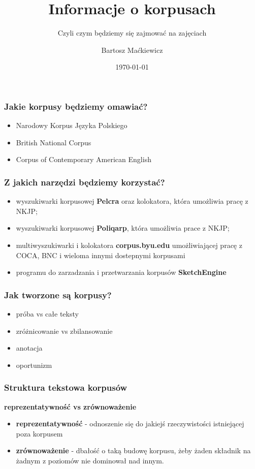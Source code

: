 \documentclass{beamer}
\title{Informacje o korpusach}
\subtitle{Czyli czym będziemy się zajmować na zajęciach}
\date{\today}
\author{Bartosz Maćkiewicz}
\institute{Instytut Filozofii, Uniwersytet Warszawski}
\begin{document}
\maketitle

\begin{frame}
  \frametitle{Jakie korpusy będziemy omawiać?}
  \Large
  \begin{itemize}
  \item Narodowy Korpus Języka Polskiego
  \item British National Corpus
  \item Corpus of Contemporary American English
  \end{itemize}
\end{frame}

\begin{frame}
  \frametitle{Z jakich narzędzi będziemy korzystać?}
  \Large
  \begin{itemize}
  \item wyszukiwarki korpusowej \textbf{Pelcra} oraz kolokatora, która umożliwia pracę z NKJP;
  \item wyszukiwarki korpusowej \textbf{Poliqarp}, która umożliwia prace z NKJP;
  \item multiwyszukiwarki i kolokatora \textbf{corpus.byu.edu} umożliwiającej pracę z COCA, BNC i wieloma innymi dostepnymi korpusami
  \item programu do zarzadzania i przetwarzania korpusów \textbf{SketchEngine}
  \end{itemize}
\end{frame}

\begin{frame}
  \Large
  \frametitle{Jak tworzone są korpusy?}
  \begin{itemize}
  \item próba vs całe teksty
  \item zróżnicowanie vs zbilansowanie
  \item anotacja
  \item oportunizm
  \end{itemize}
\end{frame}

\begin{frame}
  \Large
  \frametitle{Struktura tekstowa korpusów}
  \textbf{reprezentatywność vs zrównoważenie}
  \begin{itemize}
   \item \textbf{reprezentatywność} - odnoszenie się do jakiejś rzeczywistości istniejącej poza korpusem
   \item \textbf{zrównoważenie} - dbałość o taką budowę korpusu, żeby żaden składnik na żadnym z poziomów nie dominował nad innym.
  \end{itemize}
\end{frame}
\end{document}
